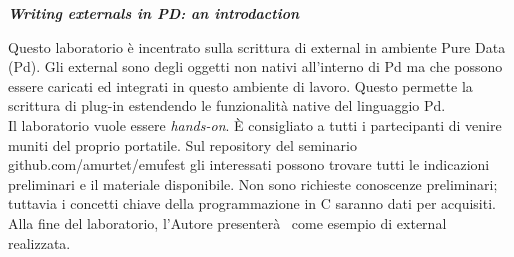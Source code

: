 \begin{flushleft}
\textbf{\emph{Writing externals in PD: an introdaction}}

Questo laboratorio \`e incentrato sulla scrittura di external in ambiente Pure Data (Pd). Gli external sono degli oggetti non nativi all'interno di Pd ma che possono essere caricati ed integrati in questo ambiente di lavoro. Questo permette la scrittura di plug-in estendendo le funzionalit\`a native del linguaggio Pd. \\
Il laboratorio vuole essere \emph{hands-on}. \`E consigliato a tutti i partecipanti di venire muniti del proprio portatile. Sul repository del seminario github.com/amurtet/emufest gli interessati possono trovare tutti le indicazioni preliminari e il materiale disponibile. Non sono richieste conoscenze preliminari; tuttavia i concetti chiave della programmazione in C saranno dati per acquisiti. \\
Alla fine del laboratorio, l'Autore presenter\`a \pa ~come esempio di external realizzata. \\

\end{flushleft}
